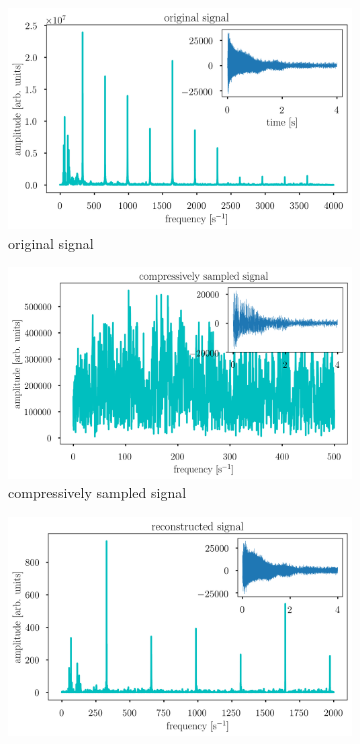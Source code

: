 \documentclass[10pt,a4paper,twoside]{article}
\begin{document}
\begin{figure}[!htb]
	\centering
	\begin{subfigure}{0.32\linewidth}
		\centering
		\includegraphics[width=\linewidth]{E1_original.png}
		\caption{original signal}
		\label{fig:record-orig}
	\end{subfigure}
	\begin{subfigure}{0.32\linewidth}
		\centering
		\includegraphics[width=\linewidth]{E1_comp.png}
		\caption{compressively sampled signal}
		\label{fig:record-comp}
	\end{subfigure}
	\begin{subfigure}{0.32\linewidth}
		\centering
		\includegraphics[width=\linewidth]{E1_recon_lasso.png}

\end{subfigure}
\end{figure}
\end{document}
